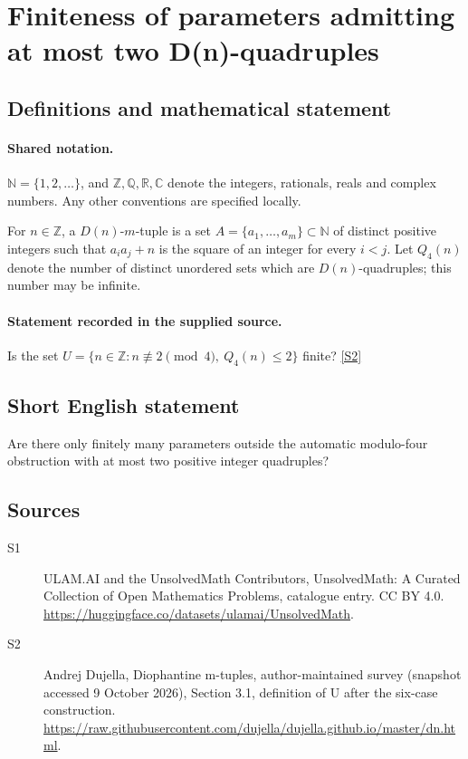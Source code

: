 \documentclass[11pt]{article}
\newcommand{\sref}[2]{\hyperlink{source:#1:#2}{[S#2]}}
\begin{document}
\section{Finiteness of parameters admitting at most two D(n)-quadruples}\label{statement}

\subsection{Definitions and mathematical statement}

\paragraph{Shared notation.}$\mathbb N=\{1,2,\ldots\}$, and $\mathbb Z,\mathbb Q,\mathbb R,\mathbb C$ denote the integers, rationals, reals and complex numbers. Any other conventions are specified locally.


For $n\in\mathbb Z$, a $D(n)$-$m$-tuple is a set $A=\{a_1,\ldots,a_m\}\subset\mathbb N$ of distinct positive integers such that $a_i a_j+n$ is the square of an integer for every $i<j$. Let $Q_4(n)$ denote the number of distinct unordered sets which are $D(n)$-quadruples; this number may be infinite.
\paragraph{Statement recorded in the supplied source.}
Is the set $U=\{n\in\mathbb Z:n\not\equiv2\pmod4,\ Q_4(n)\le2\}$ finite? \sref{statement}{2}
\subsection{Short English statement}
Are there only finitely many parameters outside the automatic modulo-four obstruction with at most two positive integer quadruples?
\subsection{Sources}
\begin{description}
\item[\hypertarget{source:statement:1}{S1}] ULAM.AI and the UnsolvedMath Contributors, UnsolvedMath: A Curated Collection of Open Mathematics Problems, catalogue entry. CC BY 4.0. \url{https://huggingface.co/datasets/ulamai/UnsolvedMath}.
\item[\hypertarget{source:statement:2}{S2}] Andrej Dujella, Diophantine m-tuples, author-maintained survey (snapshot accessed 9 October 2026), Section 3.1, definition of U after the six-case construction. \url{https://raw.githubusercontent.com/dujella/dujella.github.io/master/dn.html}.
\end{description}
\label{end:statement}
\end{document}
